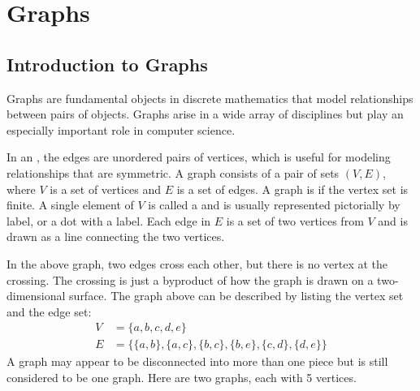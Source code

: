 \section{Graphs}
\subsection{Introduction to Graphs}
Graphs are fundamental objects in discrete mathematics that model relationships between pairs of objects. Graphs arise in a wide array of disciplines but play an especially important role in computer science.

In an , the edges are unordered pairs of vertices, which is useful for modeling relationships that are symmetric. A graph consists of a pair of sets $(V,E)$, where $V$ is a set of vertices and $E$ is a set of edges. A graph is  if the vertex set is finite. A single element of $V$ is called a  and is usually represented pictorially by label, or a dot with a label. Each edge in $E$ is a set of two vertices from $V$ and is drawn as a line connecting the two vertices.
\begin{center}
\end{center}
In the above graph, two edges cross each other, but there is no vertex at the crossing. The crossing is just a byproduct of how the graph is drawn on a two-dimensional surface. The graph above can be described by listing the vertex set and the edge set:
\begin{align*}
  V & = \{a,b,c,d,e\}                                       \\
  E & = \{\{a,b\},\{a,c\},\{b,c\},\{b,e\},\{c,d\},\{d,e\}\}
\end{align*}
A graph may appear to be disconnected into more than one piece but is still considered to be one graph. Here are two graphs, each with 5 vertices.
